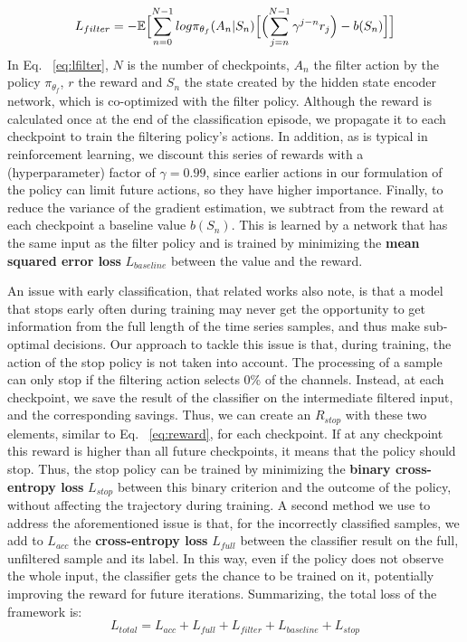 \documentclass[conference]{IEEEtran}
\begin{document}
{\small
\begin{equation}\label{eq:lfilter}
    L_{filter} = -\mathbb{E} \Bigl[ \sum_{n=0}^{N-1} log \pi_{\theta_{f}}(A_{n}|S_{n})\Bigl[\Bigl(\sum_{j=n}^{N-1}\gamma^{j-n}r_{j}\Bigr) - b(S_{n}) \Bigr]\Bigr]
\end{equation}}
In Eq. ~\ref{eq:lfilter}, $N$ is the number of checkpoints, $A_{n}$ the filter action by the policy $\pi_{\theta_{f}}$, $r$ the reward and $S_{n}$ the state created by the hidden state encoder network, which is co-optimized with the filter policy. Although the reward is calculated once at the end of the classification episode, we propagate it to each checkpoint to train the filtering policy's actions. In addition, as is typical in reinforcement learning, we discount this series of rewards with a (hyperparameter) factor of $\gamma=0.99$, since earlier actions in our formulation of the policy can limit future actions, so they have higher importance. Finally, to reduce the variance of the gradient estimation, we subtract from the reward at each checkpoint a baseline value $b(S_{n})$. This is learned by a network that has the same input as the filter policy and is trained by minimizing the \textbf{mean squared error loss} $L_{baseline}$ between the value and the reward. 

An issue with early classification, that related works also note, is that a model that stops early often during training may never get the opportunity to get information from the full length of the time series samples, and thus make sub-optimal decisions\cite{martinez2020adaptive,hartvigsen2022stop}. Our approach to tackle this issue is that, during training, the action of the stop policy is not taken into account. The processing of a sample can only stop if the filtering action selects 0\% of the channels. Instead, at each checkpoint, we save the result of the classifier on the intermediate filtered input, and the corresponding savings. Thus, we can create an $R_{stop}$ with these two elements, similar to Eq. ~\ref{eq:reward}, for each checkpoint. If at any checkpoint this reward is higher than all future checkpoints, it means that the policy should stop. Thus, the stop policy can be trained by minimizing the \textbf{binary cross-entropy loss} $L_{stop}$ between this binary criterion and the outcome of the policy, without affecting the trajectory during training. A second method we use to address the aforementioned issue is that, for the incorrectly classified samples, we add to $L_{acc}$ the \textbf{cross-entropy loss} $L_{full}$ between the classifier result on the full, unfiltered sample and its label. In this way, even if the policy does not observe the whole input, the classifier gets the chance to be trained on it, potentially improving the reward for future iterations. Summarizing, the total loss of the framework is:
\begin{equation}
    L_{total} = L_{acc} + L_{full} + L_{filter}  + L_{baseline} + L_{stop}
\end{equation}
\end{document}
